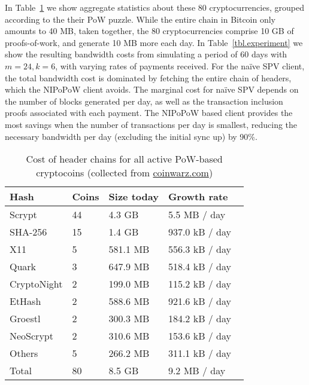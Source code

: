 In Table~\ref{tbl.currencies} we show aggregate statistics about these 80
cryptocurrencies, grouped according to the their PoW puzzle. While the entire
chain in Bitcoin only amounts to 40 MB, taken together, the 80 cryptocurrencies
comprise 10 GB of proofs-of-work, and generate 10 MB more each day. In
Table~\ref{tbl.experiment} we show the resulting bandwidth costs from simulating
a period of 60 days with $m=24, k=6$, with varying rates of payments received.
%
For the na\"ive SPV client, the total bandwidth cost is dominated by fetching
the entire chain of headers, which the NIPoPoW client avoids. The marginal
cost for na\"ive SPV depends on the number of blocks generated per day, as well
as the transaction inclusion proofs associated with each payment. The NIPoPoW
based client provides the most savings when the number of transactions per day
is smallest, reducing the necessary bandwidth per day (excluding the initial
sync up) by 90\%.

\begin{table}
  \caption{Cost of header chains for all active PoW-based cryptocoins
           (collected from \url{coinwarz.com})}
  \label{tbl.currencies}
  \small
  \centering
  \begin{tabular}{l|l|l|l}
    {\bf Hash} & {\bf Coins} & {\bf Size today} & {\bf Growth rate}  \\
    \hline
    Scrypt  & 44  & 4.3 GB  & 5.5 MB / day \  \\
    SHA-256  & 15  & 1.4 GB  & 937.0 kB / day \  \\
    X11  & 5  & 581.1 MB  & 556.3 kB / day \  \\
    Quark  & 3  & 647.9 MB  & 518.4 kB / day \  \\
    CryptoNight  & 2  & 199.0 MB  & 115.2 kB / day \  \\
    EtHash  & 2  & 588.6 MB  & 921.6 kB / day \  \\
    Groestl  & 2  & 300.3 MB  & 184.2 kB / day \  \\
    NeoScrypt  & 2  & 310.6 MB  & 153.6 kB / day \  \\
    Others  & 5  & 266.2 MB  & 311.1 kB / day \  \\
    \hline
    Total  & 80   &  8.5 GB  & 9.2 MB  / day  \\
  \end{tabular}
\end{table}

